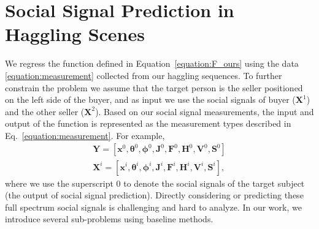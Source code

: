 
\section{Social Signal Prediction in Haggling Scenes}
We regress the function defined in Equation~\ref{equation:F_ours} using the data \ref{equation:measurement} collected from our haggling sequences. To further constrain the problem we assume that the target person is the seller positioned on the left side of the buyer, and as input we use the social signals of buyer ($\mathbf{X}^1$) and the other seller ($\mathbf{X}^2$). Based on our social signal measurements, the input and output of the function is represented as the measurement types described in Eq.~\ref{equation:measurement}. For example,
\begin{equation}
\begin{gathered}
\mathbf{Y} = [ \mathbf{x}^0, \boldsymbol{\theta}^0, \boldsymbol{\phi}^0, \mathbf{J}^0, \mathbf{F}^0, \mathbf{H}^0, \mathbf{V}^0, \mathbf{S}^0 ]\\
\mathbf{X}^i = [ \mathbf{x}^i, \boldsymbol{\theta}^i, \boldsymbol{\phi}^i, \mathbf{J}^i, \mathbf{F}^i, \mathbf{H}^i, \mathbf{V}^i, \mathbf{S}^i ],
\end{gathered}
\end{equation}
where we use the superscript 0 to denote the social signals of the target subject (the output of social signal prediction). Directly considering or predicting these full spectrum social signals is challenging and hard to analyze. In our work, we introduce several sub-problems using baseline methods. 


